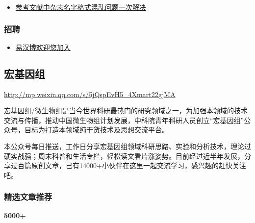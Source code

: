 \documentclass[]{article}
\providecommand{\tightlist}{%
  \setlength{\itemsep}{0pt}\setlength{\parskip}{0pt}}
\numberwithin{figure}{section}
\numberwithin{table}{section}
\begin{document}
\begin{itemize}
\tightlist
\item
  \href{http://mp.weixin.qq.com/s/Diwevx-TVe0Vq_rdgzIkrw}{参考文献中杂志名字格式混乱问题一次解决}
\end{itemize}

\hypertarget{ux62dbux8058}{%
\subsubsection{招聘}\label{ux62dbux8058}}

\begin{itemize}
\tightlist
\item
  \href{http://mp.weixin.qq.com/s?__biz=MzI5MTcwNjA4NQ==\&mid=2247484036\&idx=5\&sn=bb1007d2c3d60e7a2bcf2d6fc7a9a2bb\&chksm=ec0dc70edb7a4e185bafd0f49440bf1a032915c7e8d8fc2cb37c70a81ce3446a4ae990df89a5\#rd}{易汉博欢迎您加入}
\end{itemize}

\hypertarget{ux5b8fux57faux56e0ux7ec4}{%
\subsection{宏基因组}\label{ux5b8fux57faux56e0ux7ec4}}

\url{http://mp.weixin.qq.com/s/5jQspEvH5_4Xmart22gjMA}

宏基因组/微生物组是当今世界科研最热门的研究领域之一，为加强本领域的技术交流与传播，推动中国微生物组计划发展，中科院青年科研人员创立``宏基因组''公众号，目标为打造本领域纯干货技术及思想交流平台。

本公众号每日推送，工作日分享宏基因组领域科研思路、实验和分析技术，理论过硬实战强；周末科普和生活专栏，轻松读文看片涨姿势。目前经过近半年发展，分享过百篇原创文章，已有14000+小伙伴在这里一起交流学习，感兴趣的赶快关注吧。

\hypertarget{ux7cbeux9009ux6587ux7ae0ux63a8ux8350}{%
\subsubsection{精选文章推荐}\label{ux7cbeux9009ux6587ux7ae0ux63a8ux8350}}

\textbf{5000+}
\end{document}
